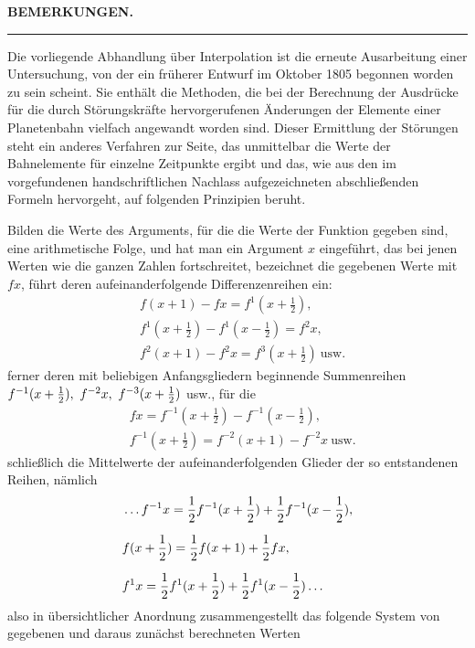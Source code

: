 \begingroup
\renewcommand{\arraystretch}{1.45}
\clearpage{}
\begin{center}\textbf{BEMERKUNGEN.}\end{center}
\begin{center}\rule{3em}{0.3pt}\end{center}

Die vorliegende Abhandlung über Interpolation ist die erneute Ausarbeitung einer Untersuchung, von der ein früherer Entwurf im Oktober 1805 begonnen worden zu sein scheint. Sie enthält die Methoden, die bei der Berechnung der Ausdrücke für die durch Störungskräfte hervorgerufenen Änderungen der Elemente einer Planetenbahn vielfach angewandt worden sind. Dieser Ermittlung der Störungen steht ein anderes Verfahren zur Seite, das unmittelbar die Werte der Bahnelemente für einzelne Zeitpunkte ergibt und das, wie aus den im vorgefundenen handschriftlichen Nachlass aufgezeichneten abschließenden Formeln hervorgeht, auf folgenden Prinzipien beruht.

Bilden die Werte des Arguments, für die die Werte der Funktion gegeben sind, eine arithmetische Folge, und hat man ein Argument $x$ eingeführt, das bei jenen Werten wie die ganzen Zahlen fortschreitet, bezeichnet die gegebenen Werte mit $fx$, führt deren aufeinanderfolgende Differenzenreihen ein:
\[
\begin{aligned}
&f(x+1)-fx=f^{1}(x+\frac12),\\[6pt]
&f^{1}(x+\frac12)-f^{1}(x-\frac12)=f^{2}x,\\[6pt]
&f^{2}(x+1)-f^{2}x=f^{3}(x+\frac12)\ \mbox{usw.}
\end{aligned}
\]
ferner deren mit beliebigen Anfangsgliedern beginnende Summenreihen
\hfill\break{}
$f^{-1}(x+\nobreak{}\tfrac12),\allowbreak{}\ f^{-2}x,\allowbreak{}\ f^{-3}(x+\nobreak{}\tfrac12)$ usw.,
für die
\[
\begin{aligned}
&fx=f^{-1}(x+\frac12)-f^{-1}(x-\frac12),\\[6pt]
&f^{-1}(x+\frac12)=f^{-2}(x+1)-f^{-2}x\ \mbox{usw.}
\end{aligned}
\]
schließlich die Mittelwerte der aufeinanderfolgenden Glieder der so entstandenen Reihen, nämlich
\[
\begin{aligned}
&\mathinner{.\,.\,.} f^{-1}x=\frac12f^{-1}(x+\frac12)+\frac12f^{-1}(x-\frac12),\\[6pt]
&f(x+\frac12)=\frac12f(x+1)+\frac12fx,\\[6pt]
&f^{1}x=\frac12f^{1}(x+\frac12)+\frac12f^{1}(x-\frac12)\mathinner{.\,.\,.}
\end{aligned}
\]
also in übersichtlicher Anordnung zusammengestellt das folgende System von gegebenen und daraus zunächst berechneten Werten

